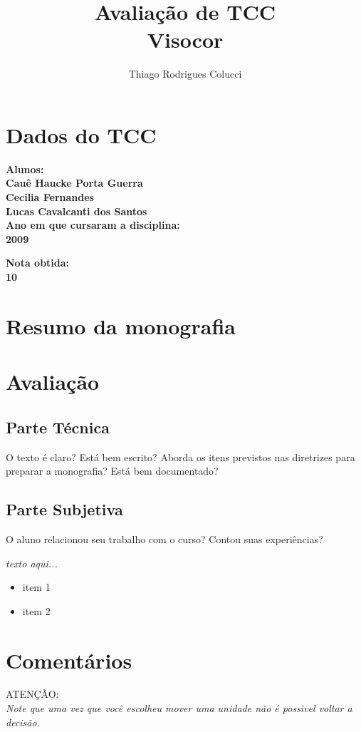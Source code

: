 \documentclass[12pt,a4paper]{article}
\title{Avaliação de TCC\\Visocor}
\author{Thiago Rodrigues Colucci}
\begin{document}
\maketitle

\newpage

\tableofcontents
\newpage
\section{Dados do TCC}
\bf{Alunos:}\\
Cauê Haucke Porta Guerra\\
Cecilia Fernandes\\
Lucas Cavalcanti dos Santos\\


\bf{Ano em que cursaram a disciplina:}\\2009


\bf{Nota obtida:}\\10


\section{Resumo da monografia}

\section{Avaliação}
\subsection{Parte Técnica}
O texto é claro? Está bem escrito? Aborda os
itens previstos nas diretrizes para preparar a monografia? Está bem
documentado?

\subsection{Parte Subjetiva}
O aluno relacionou seu trabalho com o
curso? Contou suas experiências?

\emph{texto aqui...}

\begin{itemize}
\item item 1
\item item 2
\end{itemize}

\section{Comentários}
\begin{center}
  {\large ATENÇÃO:}\\
  \emph{Note que uma vez que você escolheu mover uma unidade não é possivel voltar a decisão.}
\end{center}
\end{document}
